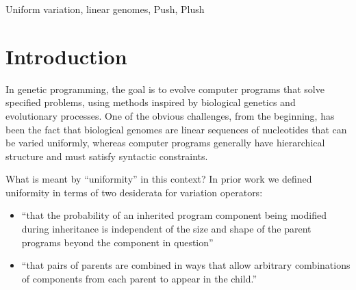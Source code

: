 \documentclass[graybox]{svmult}
\begin{document}

\begin{keywords}
Uniform variation, linear genomes, Push, Plush
\end{keywords}


\section{Introduction}
\label{Introduction}

In genetic programming, the goal is to evolve computer programs that solve specified problems, using methods inspired by biological genetics and evolutionary processes.
One of the obvious challenges, from the beginning, has been the fact that biological genomes are linear sequences of nucleotides that can be varied uniformly, whereas computer programs generally have hierarchical structure and must satisfy syntactic constraints.

What is meant by ``uniformity'' in this context? In prior work \cite{Spector:2013:GPTP} we defined uniformity in terms of two desiderata for variation operators:

\begin{itemize}
\item ``that the probability of an inherited program component being modified during inheritance is independent of the size and shape of the parent programs beyond the component in question'' 
\item ``that pairs of parents are combined in ways that allow arbitrary combinations of components from each parent to appear in the child.''
\end{itemize}
\end{document}
